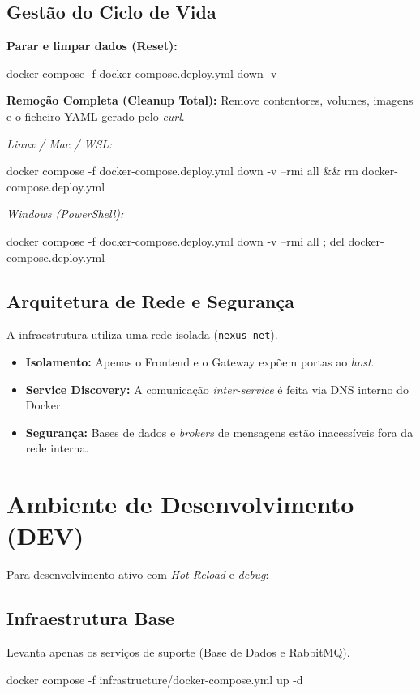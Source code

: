 \subsection{Gestão do Ciclo de Vida}

\textbf{Parar e limpar dados (Reset):}
\begin{codeblock}
docker compose -f docker-compose.deploy.yml down -v
\end{codeblock}

\textbf{Remoção Completa (Cleanup Total):}
Remove contentores, volumes, imagens e o ficheiro YAML gerado pelo \textit{curl}.

\textit{Linux / Mac / WSL:}
\begin{codeblock}
docker compose -f docker-compose.deploy.yml down -v --rmi all &&   rm docker-compose.deploy.yml
\end{codeblock}

\textit{Windows (PowerShell):}
\begin{codeblock}
docker compose -f docker-compose.deploy.yml down -v --rmi all ; del docker-compose.deploy.yml
\end{codeblock}

\subsection{Arquitetura de Rede e Segurança}
A infraestrutura utiliza uma rede isolada (\texttt{nexus-net}). 
\begin{itemize}[label=\textbullet, noitemsep]
    \item \textbf{Isolamento:} Apenas o Frontend e o Gateway expõem portas ao \textit{host}.
    \item \textbf{Service Discovery:} A comunicação \textit{inter-service} é feita via DNS interno do Docker.
    \item \textbf{Segurança:} Bases de dados e \textit{brokers} de mensagens estão inacessíveis fora da rede interna.
\end{itemize}

\section{Ambiente de Desenvolvimento (DEV)}
Para desenvolvimento ativo com \textit{Hot Reload} e \textit{debug}:

\subsection{Infraestrutura Base}
Levanta apenas os serviços de suporte (Base de Dados e RabbitMQ).
\begin{codeblock}
docker compose -f infrastructure/docker-compose.yml up -d
\end{codeblock}

